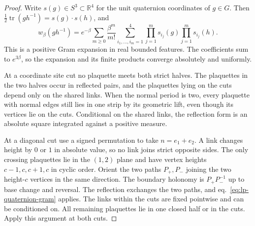 \documentclass[11pt,letterpaper,reqno]{amsart}
\numberwithin{equation}{section}
\renewcommand{\eqref}[1]{\textup{eq.~\ref{#1}}}
\theoremstyle{definition}
\theoremstyle{remark}
\begin{document}
\begin{proof}
Write \(s(g)\in S^3\subset\mathbb R^4\) for the unit quaternion
coordinates of \(g\in G\). Then
\(\frac12\operatorname{tr}(gh^{-1})=s(g)\cdot s(h)\), and
\begin{equation}\label{eq:lp-quaternion-gram}
 w_\beta(gh^{-1})=e^{-\beta}\sum_{m\ge0}\frac{\beta^m}{m!}
 \sum_{i_1,\ldots,i_m=1}^4
 \prod_{j=1}^m s_{i_j}(g)\prod_{j=1}^m s_{i_j}(h).
\end{equation}
This is a positive Gram expansion in real bounded features. The
coefficients sum to \(e^{3\beta}\), so the expansion and its finite
products converge absolutely and uniformly.

At a coordinate site cut no plaquette meets both strict halves.
The plaquettes in the two halves occur in reflected pairs, and the
plaquettes lying on the cuts depend only on the shared links.
When the normal period is two, every plaquette with normal
edges still lies in one strip by its geometric lift, even
though its vertices lie on the cuts.
Conditional on the shared links, the reflection form is an absolute
square integrated against a positive measure.

At a diagonal cut use a signed permutation to take \(n=e_1+e_2\).
A link changes height by \(0\) or \(1\) in absolute value, so no
link joins strict opposite sides. The only crossing plaquettes
lie in the \((1,2)\) plane and have vertex heights \(c-1,c,c+1,c\)
in cyclic order. Orient the two paths \(P_+,P_-\) joining the
two height-\(c\) vertices in the same direction. The boundary
holonomy is \(P_+P_-^{-1}\) up to base change and reversal.
The reflection exchanges the two paths, and
\eqref{eq:lp-quaternion-gram} applies. The links within the cuts
are fixed pointwise and can be conditioned on.
All remaining plaquettes lie in one closed half or in the cuts.
Apply this argument at both cuts.


\end{proof}
\end{document}
